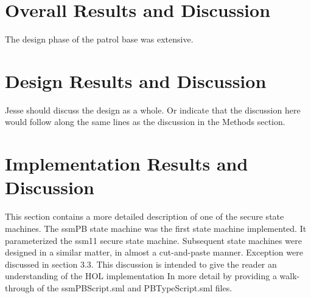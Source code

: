 % 
% 


\chapter{Overall Results and Discussion}
\label{cha:over-results-disc}

The design phase of the patrol base was extensive.


\chapter{Design Results and Discussion}
\label{cha:design-results-disc}


Jesse should discuss the design as a whole. Or indicate that the discussion here would follow
along the same lines as the discussion in the Methods section.


\chapter{Implementation Results and Discussion}
\label{cha:impl-results-disc}


This section contains a more detailed description of one of the secure state machines. The ssmPB
state machine was the first state machine implemented. It parameterized the ssm11 secure state machine.
Subsequent state machines were designed in a similar matter, in almost a cut-and-paste manner.
Exception were discussed in section 3.3. This discussion is intended to give the reader an understanding
of the HOL implementation In more detail by providing a walk-through of the ssmPBScript.sml and PBTypeScript.sml
files.


